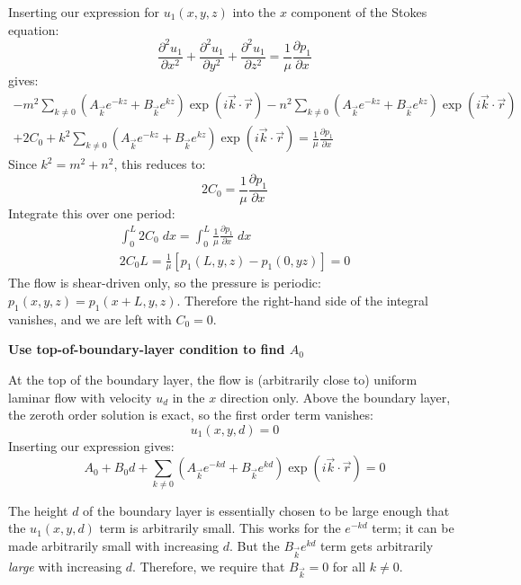 \documentclass[a4paper]{report}
\begin{document}
Inserting our expression for $u_1(x,y,z)$ into the $x$ component of the Stokes equation:
\begin{equation}
\frac{\partial^2 u_1}{\partial x^2} + \frac{\partial^2 u_1}{\partial y^2} +
\frac{\partial^2 u_1}{\partial z^2} =
\frac{1}{\mu} \frac{\partial p_1}{\partial x}
\end{equation}
gives:
\begin{multline}
- m^2
\sum_{k \neq 0} 
\left(  A_{\vec{k}} e^{-kz} + B_{\vec{k}} e^{kz} \right)
\exp(i \vec{k}\cdot \vec{r})
- n^2
\sum_{k \neq 0} 
\left(  A_{\vec{k}} e^{-kz} + B_{\vec{k}} e^{kz} \right)
\exp(i \vec{k}\cdot \vec{r}) \\
+ 2 C_0
+ k^2
\sum_{k \neq 0} 
\left(  A_{\vec{k}} e^{-kz} + B_{\vec{k}} e^{kz} \right)
\exp(i \vec{k}\cdot \vec{r})
= \frac{1}{\mu} \frac{\partial p_1}{\partial x}
\end{multline}
Since $k^2 = m^2 + n^2$, this reduces to:
\begin{equation}
2 C_0 = \frac{1}{\mu} \frac{\partial p_1}{\partial x}
\end{equation}
Integrate this over one period:
\begin{gather}
\int_0^L 2 C_0 \;dx = \int_0^L \frac{1}{\mu} \frac{\partial p_1}{\partial x} \;dx \\
2 C_0 L = \frac{1}{\mu} [ p_1(L,y,z) - p_1(0,yz) ] = 0
\end{gather}
The flow is shear-driven only, so the pressure is periodic: $p_1(x,y,z) = p_1(x+L,y,z)$.  Therefore the right-hand side of the integral vanishes, and we are left with $C_0 = 0$.

\vspace{1em}
\textbf{Use top-of-boundary-layer condition to find $A_0$}

At the top of the boundary layer, the flow is (arbitrarily close to) uniform laminar flow with velocity $u_d$ in the $x$ direction only.  Above the boundary layer, the zeroth order solution is exact, so the first order term vanishes:
\begin{equation}
u_1(x,y,d) = 0
\end{equation} 
Inserting our expression gives:
\begin{equation}
A_0 + B_0 d + \sum_{k \neq 0} 
\left(  A_{\vec{k}} e^{-kd} + B_{\vec{k}} e^{kd} \right)
\exp(i \vec{k}\cdot \vec{r})
= 0
\end{equation}

The height $d$ of the boundary layer is essentially chosen to be large enough that the $u_1(x,y,d)$ term is arbitrarily small.  This works for the $e^{-kd}$ term; it can be made arbitrarily small with increasing $d$.  But the $B_{\vec{k}} e^{kd}$ term gets arbitrarily \emph{large} with increasing $d$.  Therefore, we require that $B_{\vec{k}} = 0$ for all $k \neq 0$.
\end{document}
